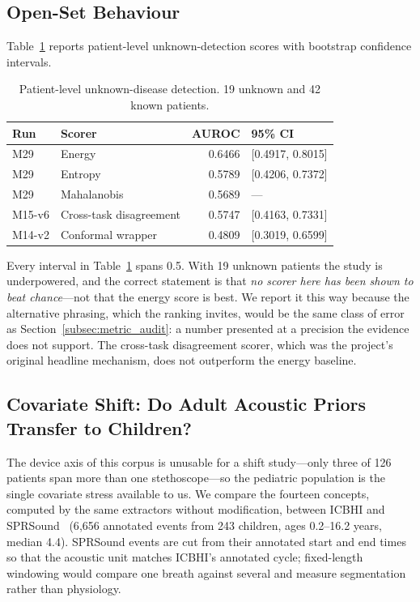 \documentclass[journal,onecolumn]{IEEEtran}
\begin{document}
\subsection{Open-Set Behaviour}
\label{subsec:openset}

Table~\ref{tab:openset} reports patient-level unknown-detection scores with bootstrap
confidence intervals.

\begin{table}[!t]
\centering
\caption{Patient-level unknown-disease detection. 19 unknown and 42 known patients.}
\label{tab:openset}
\begin{tabular}{llrl}
\toprule
Run & Scorer & AUROC & 95\% CI \\
\midrule
M29    & Energy                 & 0.6466 & [0.4917, 0.8015] \\
M29    & Entropy                & 0.5789 & [0.4206, 0.7372] \\
M29    & Mahalanobis            & 0.5689 & --- \\
M15-v6 & Cross-task disagreement& 0.5747 & [0.4163, 0.7331] \\
M14-v2 & Conformal wrapper      & 0.4809 & [0.3019, 0.6599] \\
\bottomrule
\end{tabular}
\end{table}

Every interval in Table~\ref{tab:openset} spans 0.5. With 19 unknown patients the
study is underpowered, and the correct statement is that \emph{no scorer here has
been shown to beat chance}---not that the energy score is best. We report it this way
because the alternative phrasing, which the ranking invites, would be the same class
of error as Section~\ref{subsec:metric_audit}: a number presented at a precision the
evidence does not support. The cross-task disagreement scorer, which was the
project's original headline mechanism, does not outperform the energy baseline.

\subsection{Covariate Shift: Do Adult Acoustic Priors Transfer to Children?}
\label{subsec:pediatric}

The device axis of this corpus is unusable for a shift study---only three of 126
patients span more than one stethoscope---so the pediatric population is the single
covariate stress available to us. We compare the fourteen concepts, computed by the
same extractors without modification, between ICBHI and SPRSound~\cite{zhang2022sprsound}
(6{,}656 annotated events from 243 children, ages 0.2--16.2 years, median 4.4).
SPRSound events are cut from their annotated start and end times so that the acoustic
unit matches ICBHI's annotated cycle; fixed-length windowing would compare one breath
against several and measure segmentation rather than physiology.
\end{document}
